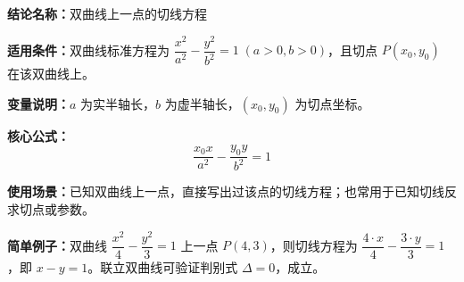 \textbf{结论名称：}双曲线上一点的切线方程

\textbf{适用条件：}双曲线标准方程为 \(\dfrac{x^{2}}{a^{2}}-\dfrac{y^{2}}{b^{2}}=1\;(a>0,b>0)\)，且切点 \(P(x_{0},y_{0})\) 在该双曲线上。

\textbf{变量说明：}\(a\) 为实半轴长，\(b\) 为虚半轴长，\((x_{0},y_{0})\) 为切点坐标。

\textbf{核心公式：}
\[
\boxed{\frac{x_{0}x}{a^{2}}-\frac{y_{0}y}{b^{2}}=1}
\]

\textbf{使用场景：}已知双曲线上一点，直接写出过该点的切线方程；也常用于已知切线反求切点或参数。

\textbf{简单例子：}双曲线 \(\dfrac{x^{2}}{4}-\dfrac{y^{2}}{3}=1\) 上一点 \(P(4,3)\)，则切线方程为 \(\dfrac{4\cdot x}{4}-\dfrac{3\cdot y}{3}=1\)，即 \(x-y=1\)。联立双曲线可验证判别式 \(\Delta=0\)，成立。